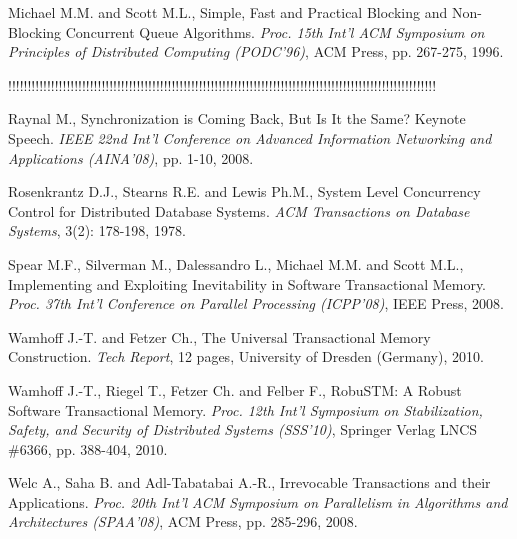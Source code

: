 \begin{thebibliography}{99}
{%
Michael M.M.  and Scott M.L., 
Simple, Fast and Practical Blocking and Non-Blocking Concurrent
Queue Algorithms.
{\it  Proc. 15th  Int'l  ACM Symposium on Principles of  Distributed 
Computing (PODC'96)},  ACM Press, pp. 267-275,  1996. 






!!!!!!!!!!!!!!!!!!!!!!!!!!!!!!!!!!!!!!!!!!!!!!!!!!!!!!!!!!!!!!!!!!!!!!!!!!!!!!!!!!!!!!!!!!!!!!!!!!!!!!!!!!!!!!









Raynal  M.,
Synchronization is Coming Back, But Is It the Same?
Keynote Speech. {\it  IEEE 22nd Int'l Conference on Advanced 
Information  Networking and Applications (AINA'08)},  pp. 1-10, 2008. 


Rosenkrantz D.J.,  Stearns R.E. and Lewis Ph.M., 
System Level Concurrency Control for Distributed Database Systems.
{\it  ACM Transactions on  Database Systems},  3(2): 178-198, 1978.


Spear M.F., Silverman M., Dalessandro L., Michael M.M.  and Scott M.L., 
Implementing and Exploiting Inevitability in Software Transactional Memory.
{\it Proc. 37th Int'l Conference on Parallel Processing (ICPP'08)}, 
IEEE Press, 2008. 




Wamhoff J.-T. and   Fetzer Ch., 
The Universal Transactional Memory Construction. 
{\it Tech Report}, 12 pages, University of Dresden (Germany), 2010. 
 

Wamhoff J.-T.,   Riegel T.,  Fetzer Ch. and  Felber F., 
RobuSTM: A Robust Software Transactional Memory.
{\it Proc. 12th Int'l Symposium on  Stabilization, Safety, and Security 
of Distributed Systems (SSS'10)}, 
Springer Verlag LNCS \#6366, pp.  388-404,  2010. 

Welc A., Saha B. and Adl-Tabatabai A.-R., 
Irrevocable Transactions and their Applications. 
{\it  Proc. 20th  Int'l  ACM Symposium on Parallelism in Algorithms 
and Architectures   (SPAA'08)},  ACM Press, pp. 285-296,  2008. 


}
\end{thebibliography}
